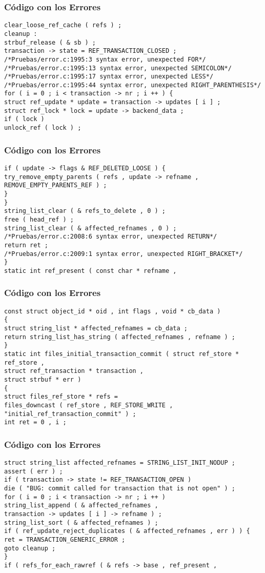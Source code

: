 \documentclass{beamer}
\begin{document}
\begin{frame}[fragile]
\frametitle{C\'odigo con los Errores}
\begin{verbatim}
clear_loose_ref_cache ( refs ) ; 
cleanup : 
strbuf_release ( & sb ) ; 
transaction -> state = REF_TRANSACTION_CLOSED ; 
/*Pruebas/error.c:1995:3 syntax error, unexpected FOR*/
/*Pruebas/error.c:1995:13 syntax error, unexpected SEMICOLON*/
/*Pruebas/error.c:1995:17 syntax error, unexpected LESS*/
/*Pruebas/error.c:1995:44 syntax error, unexpected RIGHT_PARENTHESIS*/
for ( i = 0 ; i < transaction -> nr ; i ++ ) { 
struct ref_update * update = transaction -> updates [ i ] ; 
struct ref_lock * lock = update -> backend_data ; 
if ( lock ) 
unlock_ref ( lock ) ; 
\end{verbatim}
\end{frame}
\begin{frame}[fragile]
\frametitle{C\'odigo con los Errores}
\begin{verbatim}
if ( update -> flags & REF_DELETED_LOOSE ) { 
try_remove_empty_parents ( refs , update -> refname , 
REMOVE_EMPTY_PARENTS_REF ) ; 
} 
} 
string_list_clear ( & refs_to_delete , 0 ) ; 
free ( head_ref ) ; 
string_list_clear ( & affected_refnames , 0 ) ; 
/*Pruebas/error.c:2008:6 syntax error, unexpected RETURN*/
return ret ; 
/*Pruebas/error.c:2009:1 syntax error, unexpected RIGHT_BRACKET*/
} 
static int ref_present ( const char * refname , 
\end{verbatim}
\end{frame}
\begin{frame}[fragile]
\frametitle{C\'odigo con los Errores}
\begin{verbatim}
const struct object_id * oid , int flags , void * cb_data ) 
{ 
struct string_list * affected_refnames = cb_data ; 
return string_list_has_string ( affected_refnames , refname ) ; 
} 
static int files_initial_transaction_commit ( struct ref_store * ref_store , 
struct ref_transaction * transaction , 
struct strbuf * err ) 
{ 
struct files_ref_store * refs = 
files_downcast ( ref_store , REF_STORE_WRITE , 
"initial_ref_transaction_commit" ) ; 
int ret = 0 , i ; 
\end{verbatim}
\end{frame}
\begin{frame}[fragile]
\frametitle{C\'odigo con los Errores}
\begin{verbatim}
struct string_list affected_refnames = STRING_LIST_INIT_NODUP ; 
assert ( err ) ; 
if ( transaction -> state != REF_TRANSACTION_OPEN ) 
die ( "BUG: commit called for transaction that is not open" ) ; 
for ( i = 0 ; i < transaction -> nr ; i ++ ) 
string_list_append ( & affected_refnames , 
transaction -> updates [ i ] -> refname ) ; 
string_list_sort ( & affected_refnames ) ; 
if ( ref_update_reject_duplicates ( & affected_refnames , err ) ) { 
ret = TRANSACTION_GENERIC_ERROR ; 
goto cleanup ; 
} 
if ( refs_for_each_rawref ( & refs -> base , ref_present , 
\end{verbatim}
\end{frame}
\end{document}

